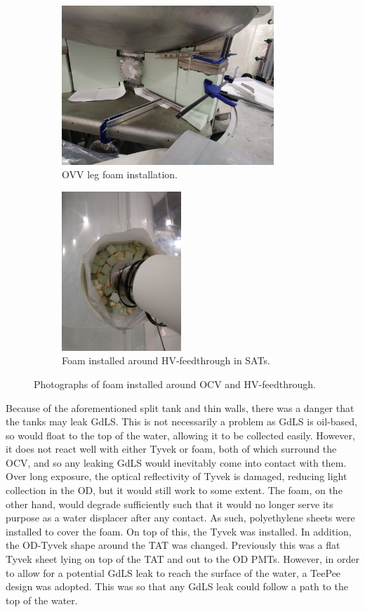 \begin{figure}[!tbph]
\begin{subfigure}{.5\textwidth}
  \centering
  \includegraphics[height=6cm, width=\linewidth]{Figures/Construction/BAT_green_foam.JPG}
  \caption{OVV leg foam installation.}
  \label{fig:ocv_leg_foam}
  \end{subfigure}
  \begin{subfigure}{.5\textwidth}
  \centering
  \includegraphics[height=6cm, width=\linewidth]{Figures/Construction/HV_foam.jpg}
  \caption{Foam installed around HV-feedthrough in SATs.}
  \label{fig:hv_port_foam}
  \end{subfigure}
\caption{Photographs of foam installed around OCV and HV-feedthrough.}
\label{fig:Additional_foam_installation}
\end{figure}

\par
Because of the aforementioned split tank and thin walls, there was a danger that the tanks may leak GdLS.
This is not necessarily a problem as GdLS is oil-based, so would float to the top of the water, allowing it to be collected easily.
However, it does not react well with either Tyvek or foam, both of which surround the OCV, and so any leaking GdLS would inevitably come into contact with them.
Over long exposure, the optical reflectivity of Tyvek is damaged, reducing light collection in the OD, but it would still work to some extent.
The foam, on the other hand, would degrade sufficiently such that it would no longer serve its purpose as a water displacer after any contact.
As such, polyethylene sheets were installed to cover the foam.
On top of this, the Tyvek was installed.
In addition, the OD-Tyvek shape around the TAT was changed.
Previously this was a flat Tyvek sheet lying on top of the TAT and out to the OD PMTs.
However, in order to allow for a potential GdLS leak to reach the surface of the water, a TeePee design was adopted.
This was so that any GdLS leak could follow a path to the top of the water.

